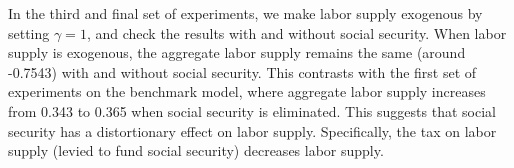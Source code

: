 \documentclass[12pt]{article}
\begin{document}
In the third and final set of experiments, we make labor supply exogenous by setting $\gamma = 1$, and check the results with and without social security. When labor supply is exogenous, the aggregate labor supply remains the same (around -0.7543) with and without social security. This contrasts with the first set of experiments on the benchmark model, where aggregate labor supply increases from 0.343 to 0.365 when social security is eliminated. This suggests that social security has a distortionary effect on labor supply. Specifically, the tax on labor supply (levied to fund social security) decreases labor supply.
\end{document}
